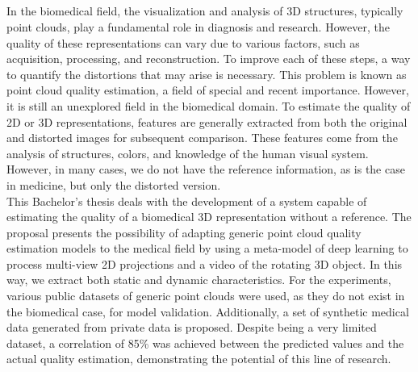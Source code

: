 \cleardoublepage


\thispagestyle{empty}


\begin{center}
{\large\bfseries \myTitleENG}\\
\end{center}
\begin{center}
\myName \\
\end{center}

\\

\\

In the biomedical field, the visualization and analysis of 3D structures, 
typically point clouds, play a fundamental role in diagnosis and research. 
However, the quality of these representations can vary due to various factors, 
such as acquisition, processing, and reconstruction. 
To improve each of these steps, a way to quantify the distortions that may 
arise is necessary. This problem is known as point cloud quality estimation, 
a field of special and recent importance. However, it is still an unexplored 
field in the biomedical domain.
To estimate the quality of 2D or 3D representations, features are generally 
extracted from both the original and distorted images for subsequent comparison. 
These features come from the analysis of structures, colors, and knowledge of 
the human visual system. However, in many cases, we do not have the reference 
information, as is the case in medicine, but only the distorted version.
\\

This Bachelor's thesis deals with the development of a system capable of estimating 
the quality of a biomedical 3D representation without a reference. The proposal 
presents the possibility of adapting generic point cloud quality estimation models 
to the medical field by using a meta-model of deep learning to process multi-view 
2D projections and a video of the rotating 3D object. In this way, 
we extract both static and dynamic characteristics.
For the experiments, various public datasets of generic point clouds were used, 
as they do not exist in the biomedical case, for model validation. 
Additionally, a set of synthetic medical data generated from private data is proposed. 
Despite being a very limited dataset, a correlation of 85\% was achieved between 
the predicted values and the actual quality estimation, demonstrating the potential of this line of research.

